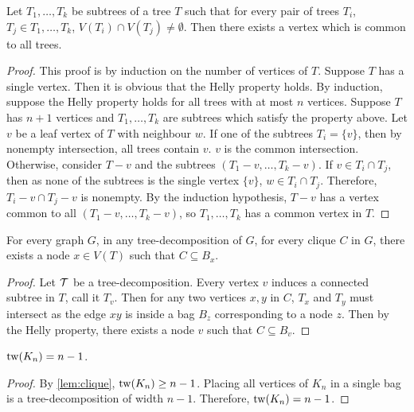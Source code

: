 \begin{lemma}\label{lem:Helly}
	Let \(T_1, \ldots, T_k\) be subtrees of a tree \(T\) such that for every pair of trees $T_i$, $T_j \in T_1, \ldots, T_k$, $V(T_i) \cap V(T_j) \neq \emptyset$. Then there exists a vertex which is common to all trees.
\end{lemma}
\begin{proof}
	This proof is by induction on the number of vertices of $T$. Suppose $T$ has a single vertex. Then it is obvious that the Helly property holds. By induction, suppose the Helly property holds for all trees with at most $n$ vertices. Suppose $T$ has $n + 1$ vertices and \(T_1, \ldots, T_k\) are subtrees which satisfy the property above. Let $v$ be a leaf vertex of $T$ with neighbour $w$. If one of the subtrees $T_i = \{v\}$, then by nonempty intersection, all trees contain $v$. $v$ is the common intersection. Otherwise, consider $T - v$ and the subtrees $(T_1 - v, \ldots, T_k - v)$. If $v \in T_i \cap T_j$, then as none of the subtrees is the single vertex $\{v\}$, $w \in T_i \cap T_j$. Therefore, $T_i - v \cap T_j - v$ is nonempty. By the induction hypothesis, $T - v$ has a vertex common to all $(T_1 - v, \ldots, T_k - v)$, so \(T_1, \ldots, T_k\) has a common vertex in $T$. 
\end{proof}

\begin{lemma}\label{lem:clique}
	For every graph $G$, in any tree-decomposition of \(G\), for every clique \(C\) in \(G\), there exists a node \(x \in V(T)\) such that \(C \subseteq B_x\).
\end{lemma}

\begin{proof}
	Let \(\mathcal{T}\) be a tree-decomposition. Every vertex \(v\) induces a connected subtree in \(T\), call it \(T_v\). Then for any two vertices \(x, y\) in \(C\), \(T_x\) and \(T_y\) must intersect as the edge \(xy\) is inside a bag \(B_z\) corresponding to a node \(z\). Then by the Helly property, there exists a node \(v\) such that \(C \subseteq B_v\).
\end{proof}

\begin{corollary}\label{cor:complete_tw}
	\(\operatorname{tw}(K_n) = n-1\).
\end{corollary}
\begin{proof}
	By \cref{lem:clique}, $\operatorname{tw}(K_n)\geq n-1$. Placing all vertices of $K_n$ in a single bag is a tree-decomposition of width $n-1$. Therefore, $\operatorname{tw}(K_n) = n-1$. 
\end{proof}

